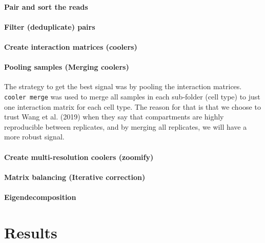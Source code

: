 \documentclass[
  a4paper,
]{scrbook}
\begin{document}
\subsubsection{Pair and sort the reads}\label{pair-and-sort-the-reads}

\subsubsection{Filter (deduplicate)
pairs}\label{filter-deduplicate-pairs}

\subsubsection{Create interaction matrices
(coolers)}\label{create-interaction-matrices-coolers}

\subsubsection{Pooling samples (Merging
coolers)}\label{pooling-samples-merging-coolers}

The strategy to get the best signal was by pooling the interaction
matrices. \texttt{cooler\ merge} was used to merge all samples in each
sub-folder (cell type) to just one interaction matrix for each cell
type. The reason for that is that we choose to trust Wang et al. (2019)
when they say that compartments are highly reproducible between
replicates, and by merging all replicates, we will have a more robust
signal.

\subsubsection{Create multi-resolution coolers
(zoomify)}\label{create-multi-resolution-coolers-zoomify}

\subsubsection{Matrix balancing (Iterative
correction)}\label{matrix-balancing-iterative-correction}

\subsubsection{Eigendecomposition}\label{eigendecomposition}

\newpage{}

\chapter{Results}\label{results}
\end{document}
